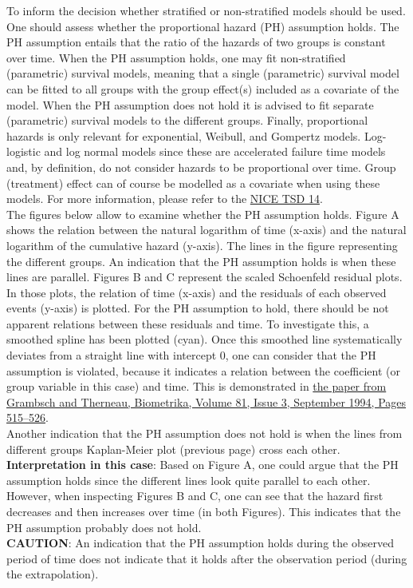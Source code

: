 \documentclass[]{article}
\begin{document}
To inform the decision whether stratified or non-stratified models
should be used. One should assess whether the proportional hazard (PH)
assumption holds. The PH assumption entails that the ratio of the
hazards of two groups is constant over time. When the PH assumption
holds, one may fit non-stratified (parametric) survival models, meaning
that a single (parametric) survival model can be fitted to all groups
with the group effect(s) included as a covariate of the model. When the
PH assumption does not hold it is advised to fit separate (parametric)
survival models to the different groups. Finally, proportional hazards
is only relevant for exponential, Weibull, and Gompertz models.
Log-logistic and log normal models since these are accelerated failure
time models and, by definition, do not consider hazards to be
proportional over time. Group (treatment) effect can of course be
modelled as a covariate when using these models. For more information,
please refer to the
\href{http://nicedsu.org.uk/wp-content/uploads/2016/03/NICE-DSU-TSD-Survival-analysis.updated-March-2013.v2.pdf}{NICE
TSD 14}.\\
The figures below allow to examine whether the PH assumption holds.
Figure A shows the relation between the natural logarithm of time
(x-axis) and the natural logarithm of the cumulative hazard (y-axis).
The lines in the figure representing the different groups. An indication
that the PH assumption holds is when these lines are parallel. Figures B
and C represent the scaled Schoenfeld residual plots. In those plots,
the relation of time (x-axis) and the residuals of each observed events
(y-axis) is plotted. For the PH assumption to hold, there should be not
apparent relations between these residuals and time. To investigate
this, a smoothed spline has been plotted (cyan). Once this smoothed line
systematically deviates from a straight line with intercept 0, one can
consider that the PH assumption is violated, because it indicates a
relation between the coefficient (or group variable in this case) and
time. This is demonstrated in
\href{https://doi.org/10.1093/biomet/81.3.515}{the paper from Grambsch
and Therneau, Biometrika, Volume 81, Issue 3, September 1994, Pages
515--526}.\\
Another indication that the PH assumption does not hold is when the
lines from different groups Kaplan-Meier plot (previous page) cross each
other.\\
\textbf{Interpretation in this case}: Based on Figure A, one could argue
that the PH assumption holds since the different lines look quite
parallel to each other. However, when inspecting Figures B and C, one
can see that the hazard first decreases and then increases over time (in
both Figures). This indicates that the PH assumption probably does not
hold.\\
\textbf{CAUTION}: An indication that the PH assumption holds during the
observed period of time does not indicate that it holds after the
observation period (during the extrapolation).
\end{document}
